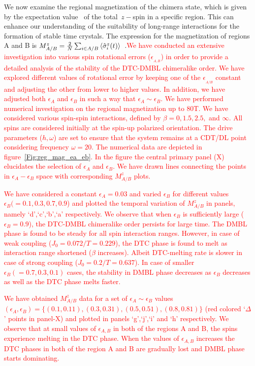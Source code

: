 \documentclass[12pt]{iopart}
\newcommand{\red}[1]{\textcolor{red}{#1}}
\begin{document}
We now examine the regional magnetization of the chimera state, which is given by the expectation value  of the total $z-$spin in a specific region. This can enhance our understanding of the suitability of long-range interactions for the formation of stable time crystals. The expression for the magnetization of regions A and B is $M^z_{A/B}=\frac{2}{N}\sum_{i\in{A/B}}\expval{\hat{\sigma}^z_i(t)}$~\cite{sakurai_phys_nodate}.\red{We have conducted an extensive investigation into various spin rotational errors ($\epsilon_{_{A,B}}$) in order to provide a detailed analysis of the stability of the DTC-DMBL chimeralike order. We have explored different values of rotational error by keeping one of the $\epsilon_{_{A/B}}$ constant and adjusting the other from lower to higher values. In addition, we have adjusted both $\epsilon_A$ and $\epsilon_B$ in such a way that $\epsilon_A \sim \epsilon_B$. We have performed  numerical investigation on the regional magnetization up to 80T. We have  considered various spin-spin interactions, defined by $\beta = 0,1.5,2.5,$ and $\infty$. All spins are considered initially at the spin-up polarized orientation. The drive parameters ($h,\omega$) are set to ensure that the system remains at a CDT/DL point considering frequency $\omega =20$. The numerical data are depicted in figure~\ref{Fig:reg_mag_ea_eb}. In the figure the central primary panel (X) elucidates the selection of $\epsilon_A$ and $\epsilon_B$. We have drawn lines connecting the points in $\epsilon_A - \epsilon_B$ space with corresponding $M^z_{A/B}$ plots. }
	
\red{We have considered a constant $\epsilon_{A} =0.03$ and varied $\epsilon_B$ for different values $\epsilon_B(= 0.1, 0.3, 0.7,0.9$) and plotted the temporal variation of $M^z_{A/B}$ in panels, namely `d',`c',`b',`a' respectively. We observe that when $\epsilon_B$ is sufficiently large ($\epsilon_B=0.9$), the DTC-DMBL chimeralike order persists for large time. The DMBL phase is found to be steady for all spin interaction ranges. However, in case of weak coupling ($J_0=0.072/T=0.229$), the DTC phase is found to melt as interaction range shortened ($\beta$ increases). Albeit DTC-melting rate is slower in case of strong coupling ($J_0=0.2/T=0.637$). In case of smaller $\epsilon_B (=0.7,0.3,0.1)$ cases, the stability in DMBL phase decreases as $\epsilon_B$ decreases as well as  the DTC phase melts faster.}

\red{We have obtained $M^z_{A/B}$ data for a set of $\epsilon_A \sim \epsilon_B$ values $(\epsilon_{A},\epsilon_{B}) = \{(0.1,0.11), (0.3,0.31),(0.5,0.51),(0.8,0.81)\}$ (red colored `$\Delta$' points in panel-X) and plotted in panels `g',`j',`i' and `h' respectively. We observe that at small values of $\epsilon_{A,B}$ in both of the regions A and B, the spins experience melting in the DTC phase. When the values of $\epsilon_{A,B}$ increases the DTC phases in both of the region A and B are gradually lost and DMBL phase starts dominating.}
\end{document}
